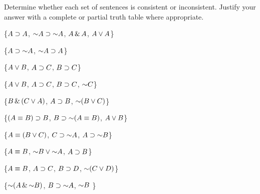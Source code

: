 \noindent\problempart
\label{pr.TT.consistent}
Determine whether each set of sentences is consistent or inconsistent. Justify your answer with a complete or partial truth table where appropriate.
\begin{exercises}
\item \{$A\supset A$, $\mathord{\sim} A \supset \mathord{\sim} A$, $A\,\&\, A$, $A\vee A$\} \vspace{.5ex}%
\item \{$A \supset \mathord{\sim} A$, $\mathord{\sim} A \supset A$\}\vspace{.5ex}%
\item \{$A\vee B$, $A\supset C$, $B\supset C$\}\vspace{.5ex} %
\item \{$A \vee B$, $A \supset C$, $B \supset C$, $\mathord{\sim} C$\}\vspace{.5ex} %
\item \{$B\,\&\,(C\vee A)$, $A\supset B$, $\mathord{\sim}(B\vee C)$\}\vspace{.5ex}  %
\item \{$(A \equiv B) \supset B$,  $B \supset \mathord{\sim} (A \equiv B)$, $A \vee B$\} \vspace{.5ex} %
\item \{$A\equiv(B\vee C)$, $C\supset \mathord{\sim} A$, $A\supset \mathord{\sim} B$\}\vspace{.5ex} %
\item  \{$A \equiv B$,  $\mathord{\sim} B \vee \mathord{\sim} A$,  $A \supset  B$\} \vspace{.5ex}%
\item \{$A \equiv B$, $A \supset C$, $B \supset D$, $\mathord{\sim}(C \vee D)$\}\vspace{.5ex} %
\item \{$\mathord{\sim} (A \,\&\, \mathord{\sim} B)$,  $B \supset \mathord{\sim} A$, $\mathord{\sim} B$ \} \vspace{.5ex} %
\end{exercises}

